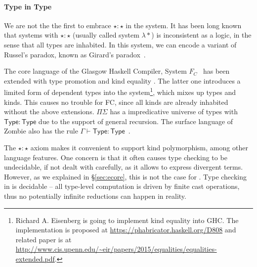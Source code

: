 \paragraph{Type in Type}
We are not the the first to embrace $\star : \star$ in the system. It
has been long known that systems with $\star : \star$ (usually called
system $\lambda *$) is inconsistent as a logic, in the sense that all
types are inhabited. In this system, we can encode a variant of
Russel's paradox, known as Girard's
paradox~\cite{coquand1986analysis}.

The core language of the Glasgow Haskell Compiler, System $F_{C}$~\cite{fc}
has been extended with type promotion \cite{fc:pro} and kind equality
\cite{fc:kind}. The latter one introduces a limited form of dependent
types into the system\footnote{Richard A. Eisenberg is going to
  implement kind equality \cite{fc:kind} into GHC. The implementation
  is proposed at \url{https://phabricator.haskell.org/D808} and
  related paper is at
  \url{http://www.cis.upenn.edu/~eir/papers/2015/equalities/equalities-extended.pdf}.},
which mixes up types and kinds. This causes no trouble for FC, since
all kinds are already inhabited without the above
extensions. $\Pi\Sigma$ has a impredicative universe of types with
$\mathsf{Type} : \mathsf{Type}$ due to the support of general
recursion. The surface language of Zombie also has the rule
$\Gamma \vdash \mathsf{Type} : \mathsf{Type}$~\cite{zombie:popl15}.

The $\star : \star$ axiom makes it convenient to support kind
polymorphism, among other language features. One concern is that it
often causes type checking to be undecidable, if not dealt with
carefully, as it allows to express divergent terms. However, as we
explained in \S\ref{sec:ecore}, this is not the case for \name. Type
checking in \name is decidable -- all type-level computation is driven
by finite cast operations, thus no potentially infinite reductions can
happen in reality.

